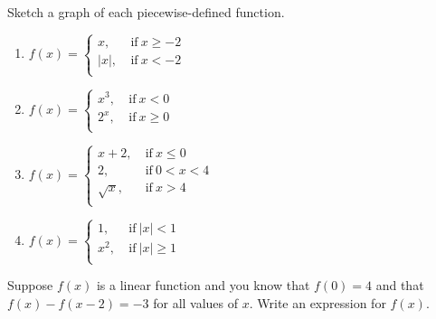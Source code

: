 \documentclass[10pt,]{book}
\theoremstyle{ptxdefinitionnotitle}
\theoremstyle{ptxdefinitiontitle}
\numberwithin{equation}{section}
\newcommand{\lt}{<}
\newcommand{\gt}{>}
\newcommand{\amp}{&}
\begin{document}
\begin{divisionexercise}{15}\hypertarget{exercise-25}{}
\hypertarget{p-77}{}%
Sketch a graph of each piecewise-defined function. \leavevmode%
\begin{enumerate}[label=(\alph*)]
\item\hypertarget{li-66}{}\(f(x) =
\begin{cases}
x, \amp  \ \text{if}  \ x \geq -2 \\
\lvert x \rvert, \amp  \ \text{if}  \ x \lt -2 \\
\end{cases}\)%
\item\hypertarget{li-67}{}\(f(x) =
\begin{cases}
x^3, \amp  \ \text{if}  \ x \lt 0 \\
2^x, \amp  \ \text{if}  \ x \geq 0 \\
\end{cases}\)%
\item\hypertarget{li-68}{}\(f(x) =
\begin{cases}
x + 2, \amp  \ \text{if}  \ x \leq 0 \\
2, \amp  \ \text{if}  \ 0 \lt x \lt 4 \\
\sqrt{x}, \amp  \ \text{if}  \ x \gt 4 \\
\end{cases}\)%
\item\hypertarget{li-69}{}\(f(x) =
\begin{cases}
1, \amp  \ \text{if}  \ \lvert x \rvert \lt 1 \\
x^2, \amp  \ \text{if}  \ \lvert x \rvert \geq 1 \\
\end{cases}\)%
\end{enumerate}
%
\end{divisionexercise}%
\begin{divisionexercise}{16}\hypertarget{exercise-26}{}
\hypertarget{p-78}{}%
Suppose \(f(x)\) is a linear function and you know that \(f(0) = 4\) and that \({f(x) - f(x-2) = -3}\) for all values of \(x\).  Write an expression for \(f(x)\).%
\end{divisionexercise}%
\end{document}
